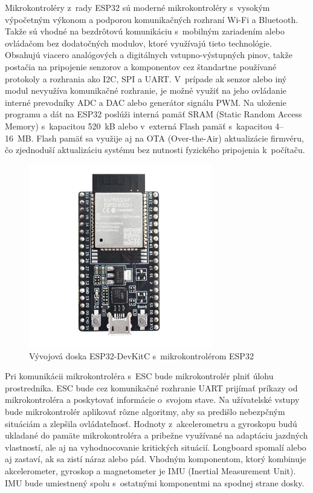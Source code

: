 Mikrokontroléry z~rady ESP32 sú moderné mikrokontroléry s~vysokým výpočetným výkonom a podporou komunikačných rozhraní Wi-Fi a Bluetooth.
Takže sú vhodné na bezdrôtovú komunikáciu s~mobilným zariadením alebo ovládačom bez dodatočných modulov, ktoré využívajú tieto technológie.
Obsahujú viacero analógových a digitálnych vstupno-výstupných pinov, takže postačia na pripojenie senzorov a komponentov cez štandartne používané protokoly a rozhrania ako I2C, SPI a UART\@.
V~prípade ak senzor alebo iný modul nevyužíva komunikačné rozhranie, je možné využiť na jeho ovládanie interné prevodníky ADC a DAC alebo generátor signálu PWM\@.
Na uloženie programu a dát na ESP32 poslúži interná pamäť SRAM (Static Random Access Memory) s~kapacitou 520~kB alebo v~externá Flash pamäť s~kapacitou 4--16~MB\@.
Flash pamäť sa využije aj na OTA (Over-the-Air) aktualizácie firmvéru, čo zjednoduší aktualizáciu systému bez nutnosti fyzického pripojenia k~počítaču.\cite{Espressif}

\begin{figure}
    \centering
    \includegraphics[height=8cm]{figures/esp32-devkit.png}
    \caption{Vývojová doska ESP32-DevKitC s~mikrokontrolérom ESP32\cite{Espressif}}
\end{figure}

Pri komunikácii mikrokontroléra s~ESC bude mikrokontrolér plniť úlohu prostredníka.
ESC bude cez komunikačné rozhranie UART prijímať príkazy od mikrokontroléra a poskytovať informácie o~svojom stave.
Na užívatelské vstupy bude mikrokontrolér aplikovať rôzne algoritmy, aby sa predišlo nebezpčným situáciám a zlepšila ovládateľnosť.
Hodnoty z~akcelerometru a gyroskopu budú ukladané do pamäte mikrokontroléra a pribežne využívané na adaptáciu jazdných vlastností, ale aj na vyhodnocovanie kritických situácií.
Longboard spomalí alebo aj zastaví, ak sa zistí náraz alebo pád.
Vhodným komponentom, ktorý kombinuje akcelerometer, gyroskop a magnetometer je IMU (Inertial Measurement Unit).
IMU bude umiestnený spolu s~ostatnými komponentmi na spodnej strane dosky.

